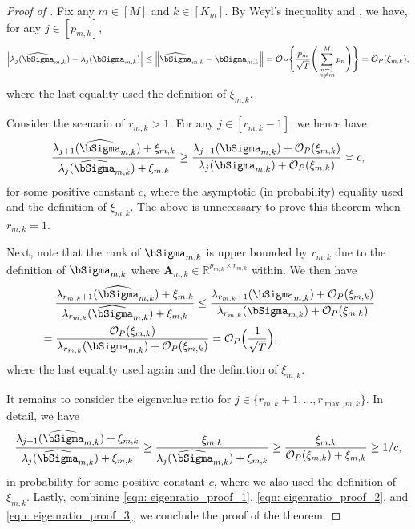 \documentclass[aos]{imsart}
\theoremstyle{plain}
\theoremstyle{definition}
\def\wh#1{\widehat{#1}}
\def\R{\mathbb{R}}
\def\cO{\mathcal{O}}
\def\bA{\mathbf{A}}
\begin{document}
\begin{proof}[Proof of ]
Fix any $m\in[M]$ and $k\in[K_m]$. By Weyl's inequality and , we have, for any $j\in[p_{m,k}]$,
\begin{align*}
    \Big| \lambda_j(\wh\bSigma_{m,k}) -\lambda_j(\bSigma_{m,k}) \Big| \leq \Big\| \wh\bSigma_{m,k} -\bSigma_{m,k} \Big\|
    = \cO_P\Bigg\{ \frac{p_m}{\sqrt{T}} \Bigg( \sum_{\substack{n=1\\ n\neq m}}^M p_n \Bigg) \Bigg\}
    = \cO_P(\xi_{m,k}) ,
\end{align*}
where the last equality used the definition of $\xi_{m,k}$.

Consider the scenario of $r_{m,k}>1$. For any $j\in[r_{m,k} -1]$, we hence have
\begin{equation}
\label{eqn: eigenratio_proof_1}
\frac{\lambda_{j+1}(\wh\bSigma_{m,k}) +\xi_{m,k}}{\lambda_j(\wh\bSigma_{m,k}) +\xi_{m,k}} 
\geq \frac{\lambda_{j+1}(\bSigma_{m,k}) +\cO_P(\xi_{m,k})}{\lambda_j(\bSigma_{m,k}) +\cO_P(\xi_{m,k})}
\asymp c ,
\end{equation}
for some positive constant $c$, where the asymptotic (in probability) equality used  and the definition of $\xi_{m,k}$. The above is unnecessary to prove this theorem when $r_{m,k}=1$.

Next, note that the rank of $\bSigma_{m,k}$ is upper bounded by $r_{m,k}$ due to the definition of $\bSigma_{m,k}$ where $\bA_{m,k}\in \R^{p_{m,k}\times r_{m,k}}$ within. We then have
\begin{equation}
\label{eqn: eigenratio_proof_2}
\begin{split}
    &\;\quad
    \frac{\lambda_{r_{m,k}+1}(\wh\bSigma_{m,k}) +\xi_{m,k}}{\lambda_{r_{m,k}}(\wh\bSigma_{m,k}) +\xi_{m,k}} \leq \frac{\lambda_{r_{m,k}+1}(\bSigma_{m,k}) +\cO_P(\xi_{m,k})}{\lambda_{r_{m,k}}(\bSigma_{m,k}) +\cO_P(\xi_{m,k})} \\
    &=
    \frac{\cO_P(\xi_{m,k})}{\lambda_{r_{m,k}}(\bSigma_{m,k}) +\cO_P(\xi_{m,k})}
    = \cO_P\Big( \frac{1}{\sqrt{T}} \Big) ,
\end{split}
\end{equation}
where the last equality used again  and the definition of $\xi_{m,k}$.

It remains to consider the eigenvalue ratio for $j\in \{r_{m,k}+1, \dots, r_{\max,m,k}\}$. In detail, we have
\begin{equation}
\label{eqn: eigenratio_proof_3}
\frac{\lambda_{j+1}(\wh\bSigma_{m,k}) +\xi_{m,k}}{\lambda_j(\wh\bSigma_{m,k}) +\xi_{m,k}}
\geq \frac{\xi_{m,k}}{\lambda_j(\wh\bSigma_{m,k}) +\xi_{m,k}}
\geq \frac{\xi_{m,k}}{\cO_P(\xi_{m,k}) +\xi_{m,k}}
\geq 1/c ,
\end{equation}
in probability for some positive constant $c$, where we also used the definition of $\xi_{m,k}$. Lastly, combining \eqref{eqn: eigenratio_proof_1}, \eqref{eqn: eigenratio_proof_2}, and \eqref{eqn: eigenratio_proof_3}, we conclude the proof of the theorem.
\end{proof}
\end{document}

